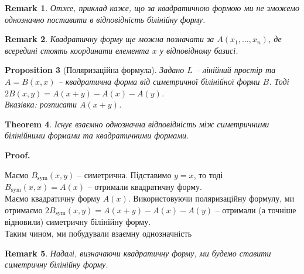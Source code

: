 \documentclass[a4paper, 10pt]{article}
\makeatletter
\theoremstyle{theoremdd}
\newtheorem{theorem}{Theorem}[subsection]
\newtheorem{proposition}[theorem]{Proposition}
\newtheorem{remark}[theorem]{Remark}
\renewenvironment{proof}[1][Proof.\\]{\par
\pushQED{\hfill \qed}%
\normalfont \topsep6\p@\@plus6\p@\relax
\trivlist
\item\relax
{\bfseries
#1\@addpunct{.}}\hspace\labelsep\ignorespaces
}{%
\popQED\endtrivlist\@endpefalse
}
\makeatother
\begin{document}
\begin{remark}
Отже, приклад каже, що за квадратичною формою ми не зможемо однозначно поставити в відповідність білінійну форму.
\end{remark}

\begin{remark}
Квадратичну форму ще можна позначати за $A(x_1,\dots,x_n)$, де всередині стоять координати елемента $x$ у відповідному базисі.
\end{remark}

\begin{proposition}[Поляризаційна формула]
Задано $L$ -- лінійний простір та $A = B(x,x)$ -- квадратична форма від симетричної білінійної форми $B$. Тоді $2B(x,y) = A(x+y) - A(x) - A(y)$.\\
\textit{Вказівка: розписати $A(x+y)$.}
\end{proposition}

\begin{theorem}
Існує взаємно однозначна відповідність між симетричними білінійними формами та квадратичними формами.
\end{theorem}

\begin{proof}
Маємо $B_{\text{sym}}(x,y)$ -- симетрична. Підставимо $y = x$, то тоді $B_{\text{sym}}(x,x) = A(x)$ -- отримали квадратичну форму.\\
Маємо квадратичну форму $A(x)$. Використовуючи поляризаційну формулу, ми отримаємо $2B_{\text{sym}}(x,y) = A(x+y) - A(x) - A(y)$ -- отримали (а точніше відновили) симетричну білінійну форму. \\
Таким чином, ми побудували взаємну однозначність
\end{proof}

\begin{remark}
Надалі, визначаючи квадратичну форму, ми будемо ставити симетричну білінійну форму.
\end{remark}
\end{document}
